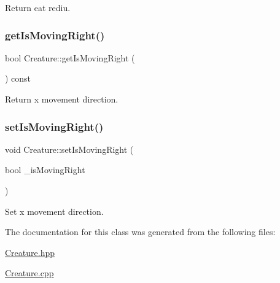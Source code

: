 Return eat rediu. 

\mbox{\label{class_creature_a63abd829cfac5d57425452b39f2a21b7}} 
\subsubsection{\texorpdfstring{get\+Is\+Moving\+Right()}{getIsMovingRight()}}
{\footnotesize\ttfamily bool Creature\+::get\+Is\+Moving\+Right (\begin{DoxyParamCaption}{ }\end{DoxyParamCaption}) const}



Return x movement direction. 

\mbox{\label{class_creature_a7b222797d42b668ebf2a02eef51feaf8}} 
\subsubsection{\texorpdfstring{set\+Is\+Moving\+Right()}{setIsMovingRight()}}
{\footnotesize\ttfamily void Creature\+::set\+Is\+Moving\+Right (\begin{DoxyParamCaption}\item[{bool}]{\+\_\+is\+Moving\+Right }\end{DoxyParamCaption})}



Set x movement direction. 



The documentation for this class was generated from the following files\+:\begin{DoxyCompactItemize}
\item 
\mbox{\hyperlink{_creature_8hpp}{Creature.\+hpp}}\item 
\mbox{\hyperlink{_creature_8cpp}{Creature.\+cpp}}\end{DoxyCompactItemize}
